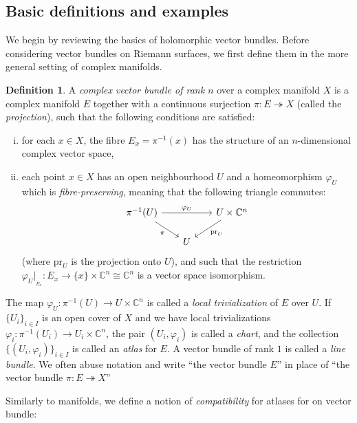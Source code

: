 \documentclass[10pt]{amsart}
\numberwithin{equation}{section}
\newcommand{\vp}{\varphi}
\newcommand{\C}{\mathbb{C}}
\newcommand{\epi}{\twoheadrightarrow}
\newcommand{\pr}{\mathrm{pr}}
\theoremstyle{plain}
\theoremstyle{definition}
\newtheorem{defn}[thm]{Definition}
\theoremstyle{remark}
\begin{document}
\subsection{Basic definitions and examples} We begin by reviewing the basics of holomorphic vector bundles. Before considering vector bundles on Riemann surfaces, we first define them in the more general setting of complex manifolds. 
\begin{defn}\label{defn:1.1}
    A \emph{complex vector bundle of rank $n$} over a complex manifold $X$ is a complex manifold $E$ together with a continuous surjection $\pi: E \epi X$ (called the \emph{projection}), such that the following conditions are satisfied:
    \begin{enumerate}[(i)]
        \item for each $x \in X$, the fibre $E_x = \pi^{-1}(x)$ has the structure of an $n$-dimensional complex vector space, 
        \item each point $x \in X$ has an open neighbourhood $U$ and a homeomorphism $\vp_U$ which is \emph{fibre-preserving}, meaning that the following triangle commutes:
        \begin{equation}\label{eq:1.1}
            \begin{tikzcd}[sep=scriptsize]
                {\pi^{-1}(U)} && {U \times \C^n} \\
                & U
                \arrow["{\vp_U}", from=1-1, to=1-3]
                \arrow["\pi"', from=1-1, to=2-2]
                \arrow["{\pr_U}", from=1-3, to=2-2]
            \end{tikzcd}
        \end{equation}
        (where $\pr_U$ is the projection onto $U$), and such that the restriction $\vp_U |_{_{E_x}}: E_x \to \{x\} \times \C^n \cong \C^n$ is a vector space isomorphism.
    \end{enumerate}
    The map $\vp_U : \pi^{-1}(U) \to U \times \C^n$ is called a \emph{local trivialization} of $E$ over $U$. If $\{U_i\}_{i \in I}$ is an open cover of $X$ and we have local trivializations $\vp_i: \pi^{-1}(U_i) \to U_i \times \C^n$, the pair $(U_i, \vp_i)$ is called a \emph{chart}, and the collection $\{(U_i, \vp_i)\}_{i \in I}$ is called an \emph{atlas} for $E$.  A vector bundle of rank $1$ is called a \emph{line bundle}. We often abuse notation and write ``the vector bundle $E$'' in place of ``the vector bundle $\pi: E \epi X$''
\end{defn}

Similarly to manifolds, we define a notion of \emph{compatibility} for atlases for on vector bundle:
\end{document}
